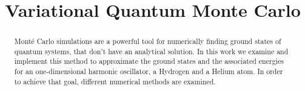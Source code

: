 \documentclass[conference]{IEEEtran}
\begin{document}
\title{Variational Quantum Monte Carlo}


\author{
\and
{}
\and
{}
}


\maketitle


\begin{abstract}

Mont\'e Carlo simulations are a powerful tool for numerically finding ground states of quantum systems, that don't have an analytical solution. In this work we examine and implement this method to approximate the ground states and the associated energies for an one-dimensional harmonic oscillator, a Hydrogen and a Helium atom. In order to achieve that goal, different numerical methods are examined.

\end{abstract}

\IEEEpeerreviewmaketitle















\end{document}
